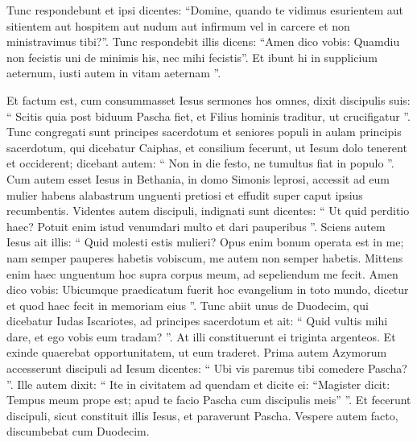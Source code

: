 \begin{biblechapter}
\begin{biblechapter}
\begin{biblechapter}
\begin{biblechapter}
\begin{biblechapter}
\begin{biblechapter}
\begin{biblechapter}
\begin{biblechapter}
\begin{biblechapter}
\begin{biblechapter}
\begin{biblechapter}
\begin{biblechapter}
\begin{biblechapter}
\begin{biblechapter}
\begin{biblechapter}
\begin{biblechapter}
\begin{biblechapter}
\begin{biblechapter}
\begin{biblechapter}
\begin{biblechapter}
\begin{biblechapter}
\begin{biblechapter}
\begin{biblechapter}
\begin{biblechapter}
\begin{biblechapter}
\verse Tunc respondebunt et ipsi dicentes: “Domine, quando te vidimus esurientem aut sitientem aut hospitem aut nudum aut infirmum vel in carcere et non ministravimus tibi?”. 
\verse Tunc respondebit illis dicens: “Amen dico vobis: Quamdiu non fecistis uni de minimis his, nec mihi fecistis”. 
\verse Et ibunt hi in supplicium aeternum, iusti autem in vitam aeternam ”.
 
\begin{biblechapter}
\verse Et factum est, cum consummasset Iesus sermones hos omnes, dixit discipulis suis: 
\verse “ Scitis quia post biduum Pascha fiet, et Filius hominis traditur, ut crucifigatur ”.
 \verse Tunc congregati sunt principes sacerdotum et seniores populi in aulam principis sacerdotum, qui dicebatur Caiphas, 
\verse et consilium fecerunt, ut Iesum dolo tenerent et occiderent; 
\verse dicebant autem: “ Non in die festo, ne tumultus fiat in populo ”.
 \verse Cum autem esset Iesus in Bethania, in domo Simonis leprosi, 
\verse accessit ad eum mulier habens alabastrum unguenti pretiosi et effudit super caput ipsius recumbentis. 
\verse Videntes autem discipuli, indignati sunt dicentes: “ Ut quid perditio haec? 
\verse Potuit enim istud venumdari multo et dari pauperibus ”. 
 \verse Sciens autem Iesus ait illis: “ Quid molesti estis mulieri? Opus enim bonum operata est in me; 
\verse nam semper pauperes habetis vobiscum, me autem non semper habetis. 
\verse Mittens enim haec unguentum hoc supra corpus meum, ad sepeliendum me fecit. 
\verse Amen dico vobis: Ubicumque praedicatum fuerit hoc evangelium in toto mundo, dicetur et quod haec fecit in memoriam eius ”.
 \verse Tunc abiit unus de Duodecim, qui dicebatur Iudas Iscariotes, ad principes sacerdotum 
\verse et ait: “ Quid vultis mihi dare, et ego vobis eum tradam? ”. At illi constituerunt ei triginta argenteos. 
\verse Et exinde quaerebat opportunitatem, ut eum traderet.
 \verse Prima autem Azymorum accesserunt discipuli ad Iesum dicentes: “ Ubi vis paremus tibi comedere Pascha? ”. 
\verse Ille autem dixit: “ Ite in civitatem ad quendam et dicite ei: “Magister dicit: Tempus meum prope est; apud te facio Pascha cum discipulis meis” ”. 
\verse Et fecerunt discipuli, sicut constituit illis Iesus, et paraverunt Pascha.
 \verse Vespere autem facto, discumbebat cum Duodecim. 

\end{biblechapter}
\end{biblechapter}
\end{biblechapter}
\end{biblechapter}
\end{biblechapter}
\end{biblechapter}
\end{biblechapter}
\end{biblechapter}
\end{biblechapter}
\end{biblechapter}
\end{biblechapter}
\end{biblechapter}
\end{biblechapter}
\end{biblechapter}
\end{biblechapter}
\end{biblechapter}
\end{biblechapter}
\end{biblechapter}
\end{biblechapter}
\end{biblechapter}
\end{biblechapter}
\end{biblechapter}
\end{biblechapter}
\end{biblechapter}
\end{biblechapter}
\end{biblechapter}
